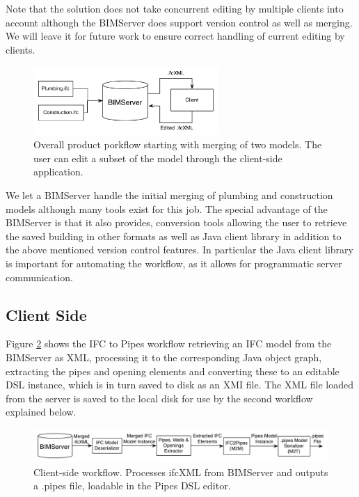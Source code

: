 Note that the solution does not take concurrent editing by multiple clients into account although the BIMServer does support version control as well as merging. We will leave it for future work to ensure correct handling of current editing by clients.

\begin{figure}[t]
    \centering
        \includegraphics[width=70mm]{images/CompleteWorkflow.pdf}
    \caption{Overall product porkflow starting with merging of two models. The user can edit a subset of the model through the client-side application.}
    \label{fig:overall_product_workflow}
\end{figure}

We let a BIMServer handle the initial merging of plumbing and construction models although many tools exist for this job. The special advantage of the BIMServer is that it also provides, conversion tools allowing the user to retrieve the saved building in other formats as well as Java client library in addition to the above mentioned version control features. In particular the Java client library is important for automating the workflow, as it allows for programmatic server communication.

\subsection{Client Side}
Figure \ref{fig:IFC2PipesWorkflow} shows the IFC to Pipes workflow retrieving an IFC model from the BIMServer as XML, processing it to the corresponding Java object graph, extracting the pipes and opening elements and converting these to an editable DSL instance, which is in turn saved to disk as an XMI file. The XML file loaded from the server is saved to the local disk for use by the second workflow explained below.

\begin{figure}[t]
    \centering
        \includegraphics[width=120mm]{images/IFC2Pipes.pdf}
    \caption{Client-side workflow. Processes ifcXML from BIMServer and outputs a .pipes file, loadable in the Pipes DSL editor.}
    \label{fig:IFC2PipesWorkflow}
\end{figure}

